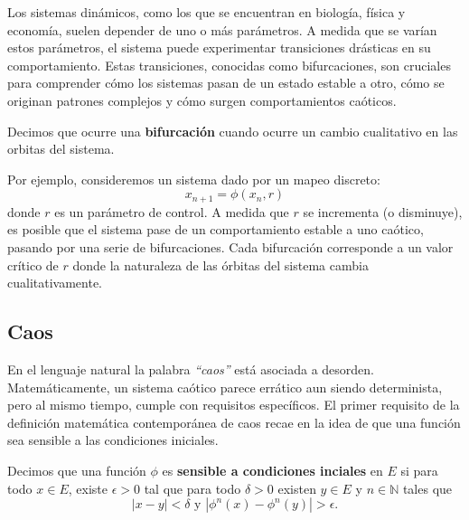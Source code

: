 \documentclass[../Main.tex]{subfiles}
\begin{document}
Los sistemas dinámicos, como los que se encuentran en biología, física y economía, suelen depender de uno o más parámetros. A medida que se varían estos parámetros, el sistema puede experimentar transiciones drásticas en su comportamiento. Estas transiciones, conocidas como bifurcaciones, son cruciales para comprender cómo los sistemas pasan de un estado estable a otro, cómo se originan patrones complejos y cómo surgen comportamientos caóticos.

\begin{definition}
\label{}
    Decimos que ocurre una \textbf{bifurcación} cuando ocurre un cambio cualitativo en las orbitas del sistema. 
\end{definition}

Por ejemplo, consideremos un sistema dado por un mapeo discreto:
\[
x_{n+1} = \phi(x_n, r)
\]
donde \( r \) es un parámetro de control. A medida que \( r \) se incrementa (o disminuye), es posible que el sistema pase de un comportamiento estable a uno caótico, pasando por una serie de bifurcaciones.  Cada bifurcación corresponde a un valor crítico de \( r \) donde la naturaleza de las órbitas del sistema cambia cualitativamente.

\subsection{Caos}
    En el lenguaje natural la palabra \textit{``caos''} está asociada a desorden. Matemáticamente, un sistema caótico parece errático aun siendo determinista, pero al mismo tiempo, cumple con requisitos específicos. El primer requisito de la definición matemática contemporánea de caos recae en la idea de que una función sea sensible a las condiciones iniciales.
\begin{definition} 
\label{}
    Decimos que una función $\phi$ es \textbf{sensible a condiciones inciales} en $E$ si para todo $x\in E$, existe $\epsilon >0$ tal que para todo $\delta >0$ existen $y\in E$ y $n\in \mathbb{N}$ tales que \[|x-y|<\delta \text{ y }|\phi^n(x)-\phi^n(y)|>\epsilon.\]
\end{definition}

\end{document}
